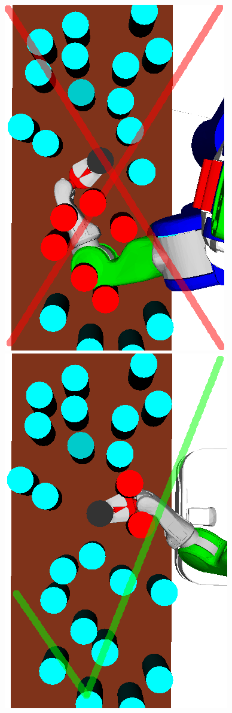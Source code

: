 \begin{figure}[t]
    \includegraphics[scale=0.19]{images/grasp_teaser_bad.png}
    \includegraphics[scale=0.185]{images/grasp_teaser_good.png}

\end{figure}
